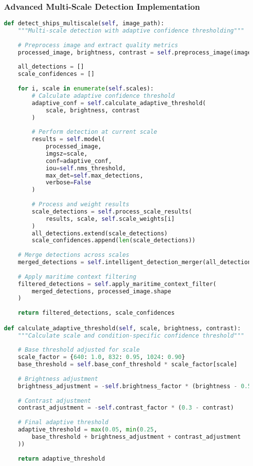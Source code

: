 \documentclass[a4paper,11pt]{article}
\begin{document}
\subsubsection{Advanced Multi-Scale Detection Implementation}
\begin{lstlisting}[language=Python, caption=Enhanced Multi-Scale Detection Pipeline]
def detect_ships_multiscale(self, image_path):
    """Multi-scale detection with adaptive confidence thresholding"""
    
    # Preprocess image and extract quality metrics
    processed_image, brightness, contrast = self.preprocess_image(image_path)
    
    all_detections = []
    scale_confidences = []
    
    for i, scale in enumerate(self.scales):
        # Calculate adaptive confidence threshold
        adaptive_conf = self.calculate_adaptive_threshold(
            scale, brightness, contrast
        )
        
        # Perform detection at current scale
        results = self.model(
            processed_image,
            imgsz=scale,
            conf=adaptive_conf,
            iou=self.nms_threshold,
            max_det=self.max_detections,
            verbose=False
        )
        
        # Process and weight results
        scale_detections = self.process_scale_results(
            results, scale, self.scale_weights[i]
        )
        all_detections.extend(scale_detections)
        scale_confidences.append(len(scale_detections))
    
    # Merge detections across scales
    merged_detections = self.intelligent_detection_merger(all_detections)
    
    # Apply maritime context filtering
    filtered_detections = self.apply_maritime_context_filter(
        merged_detections, processed_image.shape
    )
    
    return filtered_detections, scale_confidences

def calculate_adaptive_threshold(self, scale, brightness, contrast):
    """Calculate scale and condition-specific confidence threshold"""
    
    # Base threshold adjusted for scale
    scale_factor = {640: 1.0, 832: 0.95, 1024: 0.90}
    base_threshold = self.base_conf_threshold * scale_factor[scale]
    
    # Brightness adjustment
    brightness_adjustment = -self.brightness_factor * (brightness - 0.5)
    
    # Contrast adjustment  
    contrast_adjustment = -self.contrast_factor * (0.3 - contrast)
    
    # Final adaptive threshold
    adaptive_threshold = max(0.05, min(0.25, 
        base_threshold + brightness_adjustment + contrast_adjustment
    ))
    
    return adaptive_threshold
\end{lstlisting}
\end{document}
